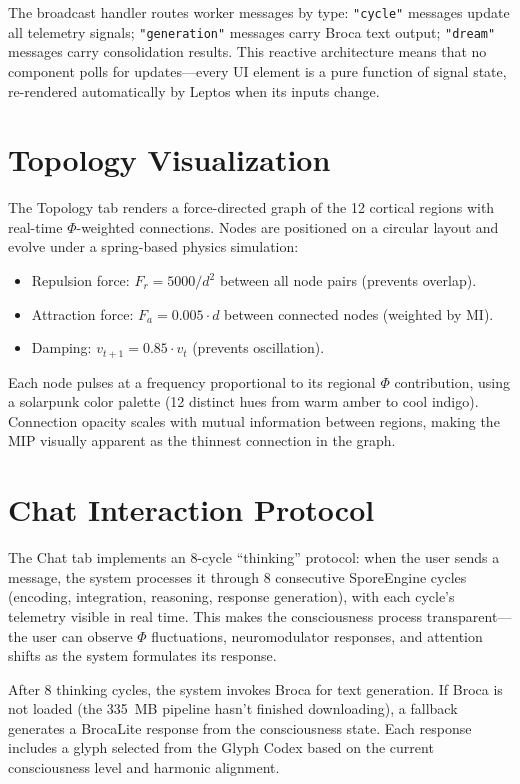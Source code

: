 \documentclass[12pt]{book}
\begin{document}
The broadcast handler routes worker messages by type: \texttt{"cycle"} messages update all telemetry signals; \texttt{"generation"} messages carry Broca text output; \texttt{"dream"} messages carry consolidation results. This reactive architecture means that no component polls for updates---every UI element is a pure function of signal state, re-rendered automatically by Leptos when its inputs change.

\section{Topology Visualization}

The Topology tab renders a force-directed graph of the 12 cortical regions with real-time $\Phi$-weighted connections. Nodes are positioned on a circular layout and evolve under a spring-based physics simulation:

\begin{itemize}
  \item Repulsion force: $F_r = 5000 / d^2$ between all node pairs (prevents overlap).
  \item Attraction force: $F_a = 0.005 \cdot d$ between connected nodes (weighted by MI).
  \item Damping: $v_{t+1} = 0.85 \cdot v_t$ (prevents oscillation).
\end{itemize}

Each node pulses at a frequency proportional to its regional $\Phi$ contribution, using a solarpunk color palette (12 distinct hues from warm amber to cool indigo). Connection opacity scales with mutual information between regions, making the MIP visually apparent as the thinnest connection in the graph.

\section{Chat Interaction Protocol}

The Chat tab implements an 8-cycle ``thinking'' protocol: when the user sends a message, the system processes it through 8 consecutive SporeEngine cycles (encoding, integration, reasoning, response generation), with each cycle's telemetry visible in real time. This makes the consciousness process transparent---the user can observe $\Phi$ fluctuations, neuromodulator responses, and attention shifts as the system formulates its response.

After 8 thinking cycles, the system invokes Broca for text generation. If Broca is not loaded (the 335~MB pipeline hasn't finished downloading), a fallback generates a BrocaLite response from the consciousness state. Each response includes a glyph selected from the Glyph Codex based on the current consciousness level and harmonic alignment.
\end{document}
